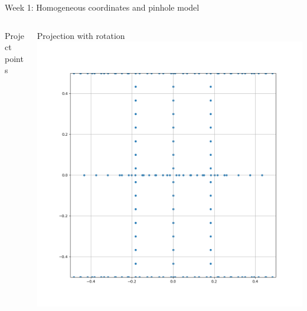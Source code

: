 \documentclass[aspectratio=169,hyperref={pdfpagelabels=false}]{beamer}
\begin{document}
\begin{frame}{ Week 1: Homogeneous coordinates and pinhole model }
\begin{columns}
\begin{column}{.3\textwidth}
\begin{block}{Project points}
		\end{block}					
	\end{column}	
	\begin{column}{.3\textwidth}
		\begin{block}{Projection with rotation}
			\includegraphics[width=\textwidth]{exercise_imgs/ex1-13.png}
		\end{block}					
	\end{column}	
\end{columns}	
\end{frame}
\end{document}
